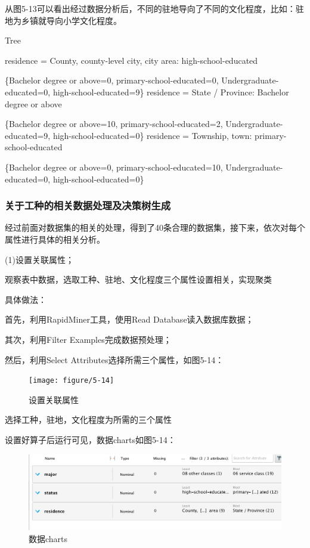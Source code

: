 从图5-13可以看出经过数据分析后，不同的驻地导向了不同的文化程度，比如：驻地为乡镇就导向小学文化程度。

 Tree 

residence = County, county-level city, city area: high-school-educated

 \{Bachelor degree or above=0, primary-school-educated=0, Undergraduate-educated=0, high-school-educated=9\}
residence = State / Province: Bachelor degree or above 

\{Bachelor degree or above=10, primary-school-educated=2, Undergraduate-educated=9, high-school-educated=0\}
residence = Township, town: primary-school-educated 

\{Bachelor degree or above=0, primary-school-educated=10, Undergraduate-educated=0, high-school-educated=0\}

\subsubsection{关于工种的相关数据处理及决策树生成}
经过前面对数据集的相关的处理，得到了40条合理的数据集，接下来，依次对每个属性进行具体的相关分析。

(1)设置关联属性；

观察表中数据，选取工种、驻地、文化程度三个属性设置相关，实现聚类

具体做法：

首先，利用RapidMiner工具，使用Read Database读入数据库数据；

其次，利用Filter Examples完成数据预处理；

 然后，利用Select Attributes选择所需三个属性，如图5-14：
 
 \begin{figure}[thbp!]
 	\centering
 	\texttt{[image: figure/5-14]}
 	\caption{设置关联属性}
 	\label{fig:5-14}
 \end{figure}

选择工种，驻地，文化程度为所需的三个属性

设置好算子后运行可见，数据charts如图5-14：

\begin{figure}[thbp!]
	\centering
	\includegraphics[width=0.4\linewidth]{figure/5-15}
	\caption{数据charts}
	\label{fig:5-15}
\end{figure}

